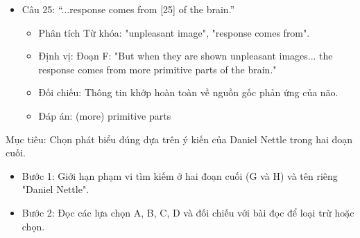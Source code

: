\documentclass{../templateReading/cdreading}
\begin{document}
\begin{itemize}
\begin{itemize}
\item Phân tích Từ khóa: "Iowa University", "neuroscientists", "pleasant and unpleasant pictures", "positive images".
\item Định vị: Đoạn F: "...studied what happens when people are shown pleasant and unpleasant pictures. When subjects see landscapes or dolphins playing..."
\item Đối chiếu: "Landscapes or dolphins playing" là ví dụ cụ thể cho "pleasant pictures" (hình ảnh tích cực).
\item Đáp án: landscapes or dolphins playing
\end{itemize}
\item Câu 25: “...response comes from [25] of the brain.”
\begin{itemize}
\item Phân tích Từ khóa: "unpleasant image", "response comes from".
\item Định vị: Đoạn F: "But when they are shown unpleasant images... the response comes from more primitive parts of the brain."
\item Đối chiếu: Thông tin khớp hoàn toàn về nguồn gốc phản ứng của não.
\item Đáp án: (more) primitive parts
\end{itemize}
\end{itemize}


Mục tiêu: Chọn phát biểu đúng dựa trên ý kiến của Daniel Nettle trong hai đoạn cuối.

\begin{itemize}
\item Bước 1: Giới hạn phạm vi tìm kiếm ở hai đoạn cuối (G và H) và tên riêng "Daniel Nettle".
\item Bước 2: Đọc các lựa chọn A, B, C, D và đối chiếu với bài đọc để loại trừ hoặc chọn.
\end{itemize}
\end{document}
